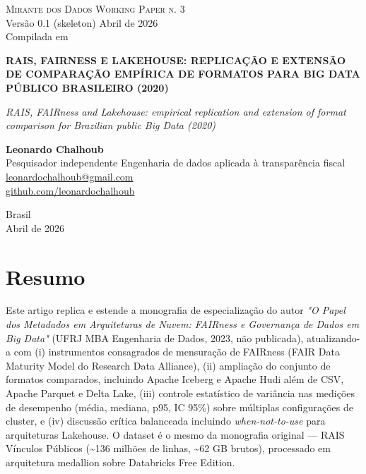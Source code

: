 \documentclass[12pt,a4paper,oneside]{article}
\begin{document}
\begin{titlepage}
  \begin{center}
    \vspace*{1.5cm}
    {\small\textsc{Mirante dos Dados \quad\textbar\quad Working Paper n. 3}}\\
    {\small Versão 0.1 (skeleton) \textemdash{} Abril de 2026}\\[2pt]
    {\footnotesize Compilada em \COMPILESTAMP\ \textbullet\ \texttt{\COMPILESHA}}

    \vfill

    {\LARGE\bfseries
     RAIS, FAIRNESS E LAKEHOUSE: REPLICAÇÃO E EXTENSÃO DE COMPARAÇÃO
     EMPÍRICA DE FORMATOS PARA BIG DATA PÚBLICO BRASILEIRO
     (2020)}

    \vspace{1cm}
    {\large\itshape
     RAIS, FAIRness and Lakehouse: empirical replication and extension
     of format comparison for Brazilian public Big Data (2020)}

    \vfill

    {\large\textbf{Leonardo Chalhoub}}\\[4pt]
    {\small Pesquisador independente \textemdash{} Engenharia de dados aplicada à transparência fiscal}\\[2pt]
    {\small\href{mailto:leonardochalhoub@gmail.com}{leonardochalhoub@gmail.com}}\\
    {\small\href{https://github.com/leonardochalhoub}{github.com/leonardochalhoub}}

    \vfill

    {\small Brasil \\ Abril de 2026}
  \end{center}
\end{titlepage}

\section*{Resumo}
Este artigo replica e estende a monografia de especialização do autor
\textit{"O Papel dos Metadados em Arquiteturas de Nuvem: FAIRness e
Governança de Dados em Big Data"} (UFRJ MBA Engenharia de Dados, 2023,
não publicada), atualizando-a com (i) instrumentos consagrados de
mensuração de FAIRness (FAIR Data Maturity Model do Research Data
Alliance), (ii) ampliação do conjunto de formatos comparados,
incluindo Apache Iceberg e Apache Hudi além de CSV, Apache Parquet e
Delta Lake, (iii) controle estatístico de variância nas medições de
desempenho (média, mediana, p95, IC 95\%) sobre múltiplas configurações
de cluster, e (iv) discussão crítica balanceada incluindo
\textit{when-not-to-use} para arquiteturas Lakehouse. O dataset é o
mesmo da monografia original — RAIS Vínculos Públicos
(\textasciitilde{}136 milhões de linhas, \textasciitilde{}62 GB
brutos), processado em arquitetura medallion sobre Databricks Free
Edition.
\end{document}

